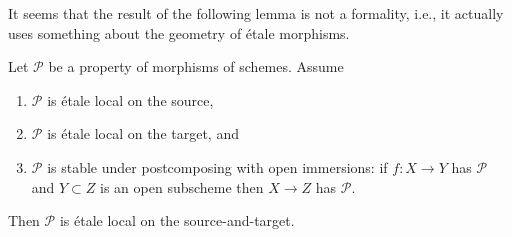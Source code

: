 \noindent
It seems that the result of the following lemma is not a formality, i.e.,
it actually uses something about the geometry of \'etale morphisms.

\begin{lemma}
\label{lemma-etale-local-source-target}
Let $\mathcal{P}$ be a property of morphisms of schemes.
Assume
\begin{enumerate}
\item $\mathcal{P}$ is \'etale local on the source,
\item $\mathcal{P}$ is \'etale local on the target, and
\item $\mathcal{P}$ is stable under postcomposing with open immersions:
if $f : X \to Y$ has $\mathcal{P}$ and $Y \subset Z$ is an open
subscheme then $X \to Z$ has $\mathcal{P}$.
\end{enumerate}
Then $\mathcal{P}$ is \'etale local on the source-and-target.
\end{lemma}

